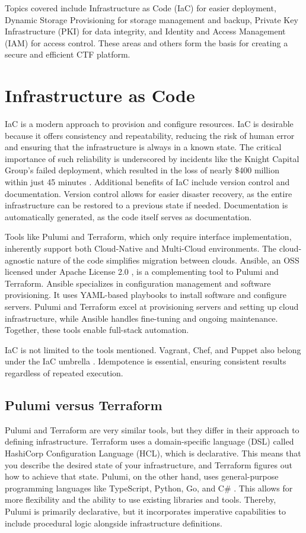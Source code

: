Topics covered include Infrastructure as Code (IaC) for easier deployment, Dynamic Storage Provisioning for storage management and backup, Private Key Infrastructure (PKI) for data integrity, and Identity and Access Management (IAM) for access control. These areas and others form the basis for creating a secure and efficient CTF platform.

\section{Infrastructure as Code}

IaC is a modern approach to provision and configure resources. IaC is desirable because it offers consistency and repeatability, reducing the risk of human error and ensuring that the infrastructure is always in a known state. The critical importance of such reliability is underscored by incidents like the Knight Capital Group's failed deployment, which resulted in the loss of nearly \$400 million within just 45 minutes \cite{seven2014knightmare}. Additional benefits of IaC include version control and documentation. Version control allows for easier disaster recovery, as the entire infrastructure can be restored to a previous state if needed. Documentation is automatically generated, as the code itself serves as documentation. 

Tools like Pulumi and Terraform, which only require interface implementation, inherently support both Cloud-Native and Multi-Cloud environments. The cloud-agnostic nature of the code simplifies migration between clouds. Ansible, an OSS licensed under Apache License 2.0 \cite{ansible_license}, is a complementing tool to Pulumi and Terraform. Ansible specializes in configuration management and software provisioning. It uses YAML-based playbooks to install software and configure servers. Pulumi and Terraform excel at provisioning servers and setting up cloud infrastructure, while Ansible handles fine-tuning and ongoing maintenance. Together, these tools enable full-stack automation.

IaC is not limited to the tools mentioned. Vagrant, Chef, and Puppet also belong under the IaC umbrella \cite{spacelift_iac_tools}. Idempotence is essential, ensuring consistent results regardless of repeated execution.

\subsection{Pulumi versus Terraform}
Pulumi and Terraform are very similar tools, but they differ in their approach to defining infrastructure. Terraform uses a domain-specific language (DSL) called HashiCorp Configuration Language (HCL), which is declarative. This means that you describe the desired state of your infrastructure, and Terraform figures out how to achieve that state. Pulumi, on the other hand, uses general-purpose programming languages like TypeScript, Python, Go, and C\# \cite{pulumi_vs_terraform}. This allows for more flexibility and the ability to use existing libraries and tools. Thereby, Pulumi is primarily declarative, but it incorporates imperative capabilities to include procedural logic alongside infrastructure definitions.

